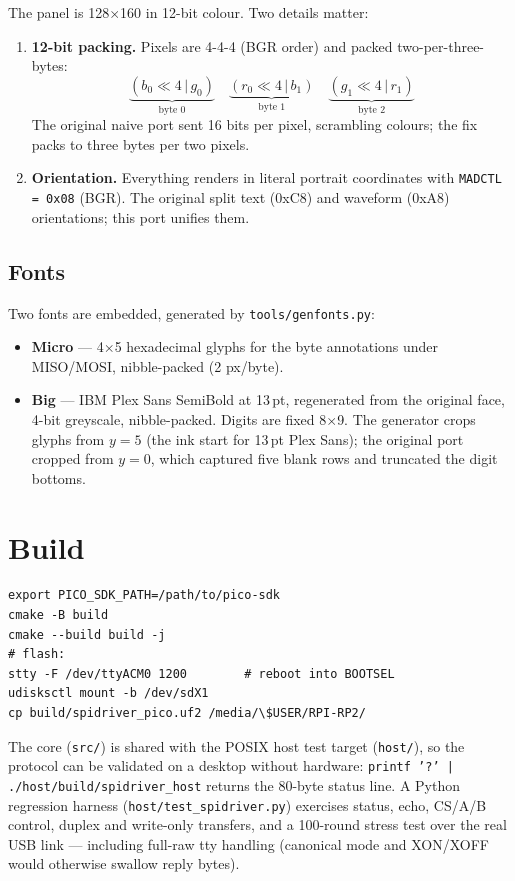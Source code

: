 \documentclass[11pt,a4paper]{article}
\begin{document}
The panel is 128$\times$160 in 12-bit colour. Two details matter:

\begin{enumerate}
\item \textbf{12-bit packing.} Pixels are 4-4-4 (BGR order) and packed
  two-per-three-bytes:
  \begin{equation}
    \underbrace{(b_0\ll4\,|\,g_0)}_{\text{byte 0}}\quad
    \underbrace{(r_0\ll4\,|\,b_1)}_{\text{byte 1}}\quad
    \underbrace{(g_1\ll4\,|\,r_1)}_{\text{byte 2}}
  \end{equation}
  The original naive port sent 16 bits per pixel, scrambling colours; the
  fix packs to three bytes per two pixels.
\item \textbf{Orientation.} Everything renders in literal portrait
  coordinates with \texttt{MADCTL = 0x08} (BGR). The original split text
  (0xC8) and waveform (0xA8) orientations; this port unifies them.
\end{enumerate}

\subsection{Fonts}

Two fonts are embedded, generated by \texttt{tools/genfonts.py}:

\begin{itemize}
\item \textbf{Micro} --- 4$\times$5 hexadecimal glyphs for the byte
  annotations under MISO/MOSI, nibble-packed (2 px/byte).
\item \textbf{Big} --- IBM Plex Sans SemiBold at 13\,pt, regenerated from
  the original face, 4-bit greyscale, nibble-packed. Digits are fixed
  8$\times$9. The generator crops glyphs from $y=5$ (the ink start for
  13\,pt Plex Sans); the original port cropped from $y=0$, which captured
  five blank rows and truncated the digit bottoms.
\end{itemize}

\section{Build}

\begin{lstlisting}[style=proto]
export PICO_SDK_PATH=/path/to/pico-sdk
cmake -B build
cmake --build build -j
# flash:
stty -F /dev/ttyACM0 1200        # reboot into BOOTSEL
udisksctl mount -b /dev/sdX1
cp build/spidriver_pico.uf2 /media/\$USER/RPI-RP2/
\end{lstlisting}

The core (\texttt{src/}) is shared with the POSIX host test target
(\texttt{host/}), so the protocol can be validated on a desktop without
hardware: \texttt{printf '?' | ./host/build/spidriver\_host} returns the
80-byte status line. A Python regression harness
(\texttt{host/test\_spidriver.py}) exercises status, echo, CS/A/B control,
duplex and write-only transfers, and a 100-round stress test over the real
USB link --- including full-raw tty handling (canonical mode and XON/XOFF
would otherwise swallow reply bytes).
\end{document}
